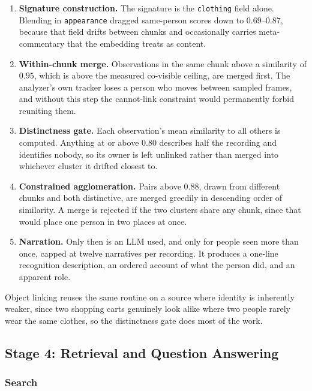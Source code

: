 \begin{enumerate}[leftmargin=1.6em]
  \item \textbf{Signature construction.} The signature is the \texttt{clothing} field
        alone. Blending in \texttt{appearance} dragged same-person scores down to
        $0.69$--$0.87$, because that field drifts between chunks and occasionally
        carries meta-commentary that the embedding treats as content.
  \item \textbf{Within-chunk merge.} Observations in the same chunk above a similarity
        of $0.95$, which is above the measured co-visible ceiling, are merged first. The
        analyzer's own tracker loses a person who moves between sampled frames, and
        without this step the cannot-link constraint would permanently forbid reuniting
        them.
  \item \textbf{Distinctness gate.} Each observation's mean similarity to all others is
        computed. Anything at or above $0.80$ describes half the recording and
        identifies nobody, so its owner is left unlinked rather than merged into
        whichever cluster it drifted closest to.
  \item \textbf{Constrained agglomeration.} Pairs above $0.88$, drawn from different
        chunks and both distinctive, are merged greedily in descending order of
        similarity. A merge is rejected if the two clusters share any chunk, since that
        would place one person in two places at once.
  \item \textbf{Narration.} Only then is an LLM used, and only for people seen more
        than once, capped at twelve narratives per recording. It produces a one-line
        recognition description, an ordered account of what the person did, and an
        apparent role.
\end{enumerate}

Object linking reuses the same routine on a source where identity is inherently weaker,
since two shopping carts genuinely look alike where two people rarely wear the same
clothes, so the distinctness gate does most of the work.

\subsection{Stage 4: Retrieval and Question Answering}

\subsubsection*{Search}

